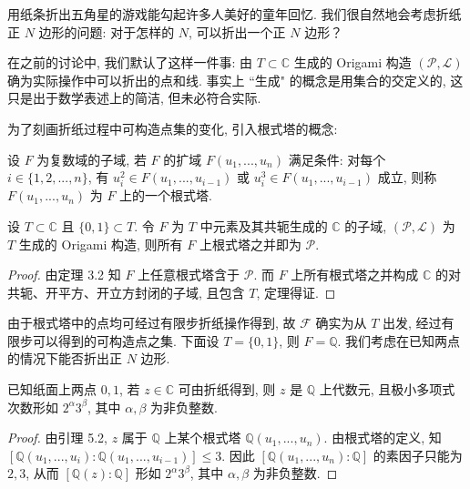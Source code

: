 用纸条折出五角星的游戏能勾起许多人美好的童年回忆. 
我们很自然地会考虑折纸正 $N$ 边形的问题: 对于怎样的 $N$, 可以折出一个正 $N$ 边形？

在之前的讨论中, 我们默认了这样一件事: 
由 $T\subset\mathbb{C}$ 生成的 Origami 构造 
$(\mathcal{P},\mathcal{L})$ 确为实际操作中可以折出的点和线. 
事实上 ``生成" 的概念是用集合的交定义的, 这只是出于数学表述上的简洁, 但未必符合实际. 

为了刻画折纸过程中可构造点集的变化, 引入根式塔的概念: 

\begin{definition}
    设 $F$ 为复数域的子域, 若 $F$ 的扩域 $F(u_1,...,u_n)$ 满足条件: 
    对每个 $i\in\{1,2,...,n\}$, 
    有 $u_i^2\in F(u_1,...,u_{i-1})$ 或 $u_i^3\in F(u_1,...,u_{i-1})$ 成立, 
    则称 $F(u_1,...,u_n)$ 为 $F$ 上的一个根式塔.
\end{definition}

\begin{lemma}
    设 $T\subset\mathbb{C}$ 且 $\{0,1\}\subset T$. 
    令 $F$ 为 $T$ 中元素及其共轭生成的 $\mathbb{C}$ 的子域, 
    $(\mathcal{P},\mathcal{L})$ 为 $T$ 生成的 Origami 构造, 
    则所有 $F$ 上根式塔之并即为 $\mathcal{P}$. 
\end{lemma}

\begin{proof}
    由定理 3.2 知 $F$ 上任意根式塔含于 $\mathcal{P}$. 
    而 $F$ 上所有根式塔之并构成 $\mathbb{C}$ 的对共轭、开平方、开立方封闭的子域, 
    且包含 $T$, 定理得证. 
\end{proof}

由于根式塔中的点均可经过有限步折纸操作得到, 
故 $\mathcal{F}$ 确实为从 $T$ 出发, 
经过有限步可以得到的可构造点之集. 
下面设 $T=\{0,1\}$, 则 $F=\mathbb{Q}$. 
我们考虑在已知两点的情况下能否折出正 $N$ 边形. 

\begin{proposition}
    已知纸面上两点 $0,1$, 若 $z\in\mathbb{C}$ 可由折纸得到, 
    则 $z$ 是 $\mathbb{Q}$ 上代数元, 
    且极小多项式次数形如 $2^\alpha 3^\beta$, 其中 $\alpha,\beta$ 为非负整数. 
\end{proposition}

\begin{proof}
    由引理 5.2,  $z$ 属于 $\mathbb{Q}$ 上某个根式塔 $\mathbb{Q}(u_1,...,u_n)$. 
    由根式塔的定义, 知 $[\mathbb{Q}(u_1,...,u_i):\mathbb{Q}(u_1,...,u_{i-1})]\leq 3$. 
    因此 $[\mathbb{Q}(u_1,...,u_n):\mathbb{Q}]$ 的素因子只能为 $2,3$, 
    从而 $[\mathbb{Q}(z):\mathbb{Q}]$ 形如 $2^\alpha 3^\beta$, 其中 $\alpha,\beta$ 为非负整数.
\end{proof}


